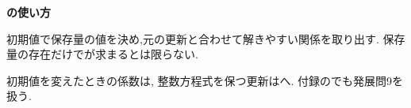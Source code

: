   \begin{bookpoint}
    \textbf{の使い方}\par
    初期値で保存量の値を決め,元の更新と合わせて解きやすい関係を取り出す.
    保存量の存在だけでが求まるとは限らない.
  \end{bookpoint}
  初期値を変えたときの係数は,
  整数方程式を保つ更新はへ.
  付録のでも発展問9を扱う.
